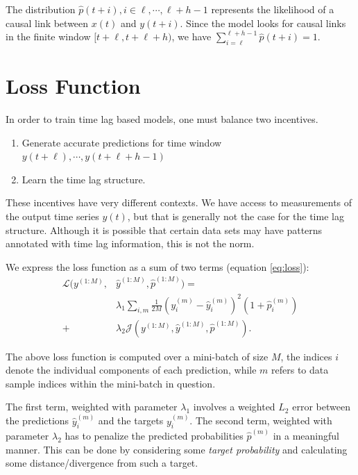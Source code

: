 \documentclass[twoside]{article}
\begin{document}
The distribution $\hat{p}(t+i), i \in {\ell, \cdots, \ell+h-1}$ represents the 
likelihood of a causal link between $x(t)$ and $y(t+i)$. Since the model looks
for causal links in the finite window $[t+\ell, t+\ell+h)$, we have 
$\sum^{\ell+h-1}_{i = \ell}{\hat{p}(t + i)} = 1$.


\section{Loss Function}

In order to train time lag based models, one must balance two incentives.

\begin{enumerate}
    \item Generate accurate predictions for time window $y(t+\ell), \cdots, y(t+\ell+h-1)$
    \item Learn the time lag structure.
\end{enumerate}

These incentives have very different contexts. We have access to measurements of the output time series $y(t)$, but that is generally not the case for the time lag structure. Although it is possible that certain data sets may have patterns annotated with time lag information, this is not the norm.

We express the loss function as a sum of two terms (equation \ref{eq:loss}):
\begin{equation}\label{eq:loss}
\begin{aligned}
\mathcal{L}(y^{(1:M)}, &\hat{y}^{(1:M)}, \hat{p}^{(1:M)}) =\\ 
&\lambda_1 \sum_{i,m}{\frac{1}{2M} (y^{(m)}_{i} - \hat{y}^{(m)}_{i})^2 (1 + \hat{p}^{(m)}_i)} \\ 
+ &\lambda_2 \mathcal{J}(y^{(1:M)}, \hat{y}^{(1:M)}, \hat{p}^{(1:M)}).
\end{aligned}
\end{equation}

The above loss function is computed over a mini-batch of size $M$, the indices $i$ denote the
individual components of each prediction, while $m$ refers to data sample indices within the
mini-batch in question.

The first term, weighted with parameter $\lambda_1$ involves a weighted $L_2$ 
error between the predictions $\hat{y}^{(m)}_{i}$ and the targets $y^{(m)}_{i}$. The second term, weighted with parameter $\lambda_2$ has to penalize the predicted probabilities $\hat{p}^{(m)}$ in a meaningful manner. This can be done by considering some \emph{target probability} and calculating some distance/divergence from such a target.
\end{document}
